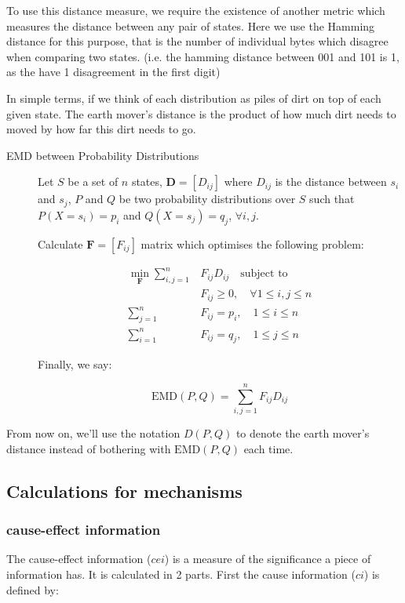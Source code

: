 To use this distance measure, we require the existence of another metric which measures the distance between any pair of states. Here we use the Hamming distance for this purpose, that is the number of individual bytes which disagree when comparing two states. (i.e. the hamming distance between 001 and 101 is 1, as the have 1 disagreement in the first digit)

In simple terms, if we think of each distribution as piles of dirt on top of each given state. The earth mover's distance is the product of how much dirt needs to moved by how far this dirt needs to go. 

\begin{description}
	\item[EMD between Probability Distributions] Let $S$ be a set of $n$ states, $\mathbf{D} = \left[ D_{ij}\right]$ where $D_{ij}$ is the distance between $s_i$ and $s_j$, $P$ and $Q$ be two probability distributions over $S$ such that $P(X = s_i) = p_i$ and $Q(X=s_j) = q_j$, $\forall i,j$. 
	
	Calculate $\mathbf{F} = \left[F_{ij}\right]$ matrix which optimises the following problem:
	
	\begin{align}
	\label{eq:EMD1}
	\min \limits_{\mathbf{F}}\sum \limits_{i,j=1}^n &F_{ij} D_{ij}\quad \text{subject to}\\
	&F_{ij}\geq 0,\quad \forall 1 \leq i,j \leq n\\
	\sum \limits_{j=1}^n &F_{ij} = p_i,\quad 1 \leq i \leq n\\
	\sum \limits_{i=1}^n &F_{ij} = q_j,\quad 1 \leq j \leq n
	\end{align}
	
	Finally, we say: 
	
	\begin{equation}
	\label{def:EMD}
	\text{EMD}(P, Q) = \sum \limits_{i,j=1}^{n} F_{ij} D_{ij}
	\end{equation}
\end{description}

From now on, we'll use the notation $D(P,Q)$ to denote the earth mover's distance instead of bothering with $\text{EMD}(P,Q)$ each time.

\subsection{Calculations for mechanisms}\label{sec:little_phi}

\subsubsection{cause-effect information}
The cause-effect information ($cei$) is a measure of the significance a piece of information has. It is calculated in 2 parts. First the cause information ($ci$) is defined by:

